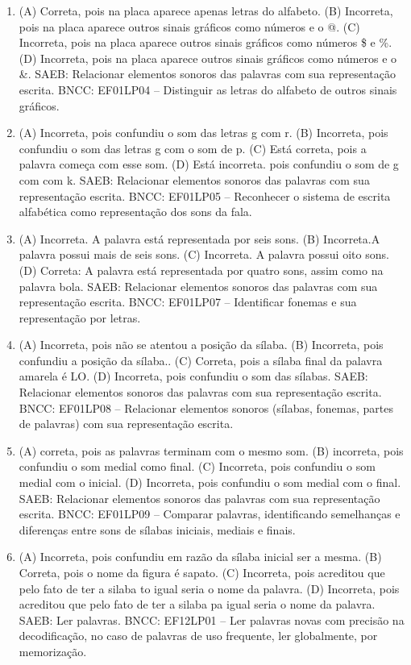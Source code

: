 \begin{enumerate}
\item
(A) Correta, pois na placa aparece apenas letras do alfabeto.
(B) Incorreta, pois na placa aparece outros sinais gráficos como números
e o @.
(C) Incorreta, pois na placa aparece outros sinais gráficos como números
\$ e \%.
(D) Incorreta, pois na placa aparece outros sinais gráficos como números
e o \&.
SAEB: Relacionar elementos sonoros das palavras com sua representação escrita.
BNCC: EF01LP04 -- Distinguir as letras do alfabeto de outros sinais gráficos.

\item
(A) Incorreta, pois confundiu o som das letras g com r.
(B) Incorreta, pois confundiu o som das letras g com o som de p.
(C) Está correta, pois a palavra começa com esse som.
(D) Está incorreta. pois confundiu o som de g com com k.
SAEB: Relacionar elementos sonoros das palavras com sua
representação escrita.
BNCC: EF01LP05 -- Reconhecer o sistema de escrita alfabética como
representação dos sons da fala.

\item
(A) Incorreta. A palavra está representada por seis sons.
(B) Incorreta.A palavra possui mais de seis sons.
(C) Incorreta. A palavra possui oito sons.
(D) Correta: A palavra está representada por quatro sons, assim como na
palavra bola.
SAEB: Relacionar elementos sonoros das palavras com sua
representação escrita.
BNCC: EF01LP07 -- Identificar fonemas e sua representação por
letras.

\item
(A) Incorreta, pois não se atentou a posição da sílaba.
(B) Incorreta, pois confundiu a posição da sílaba..
(C) Correta, pois a sílaba final da palavra amarela é LO.
(D) Incorreta, pois confundiu o som das sílabas.
SAEB: Relacionar
elementos sonoros das palavras com sua representação escrita.
BNCC: EF01LP08 -- Relacionar elementos sonoros (sílabas, fonemas,
partes de palavras) com sua representação escrita.

\item
(A) correta, pois as palavras terminam com o mesmo som.
(B) incorreta, pois confundiu o som medial como final.
(C) Incorreta, pois confundiu o som medial com o inicial.
(D) Incorreta, pois confundiu o som medial com o final.
SAEB: Relacionar elementos sonoros das palavras com sua
representação escrita.
BNCC: EF01LP09 -- Comparar palavras, identificando semelhanças e
diferenças entre sons de sílabas iniciais, mediais e finais.

\item
(A) Incorreta, pois confundiu em razão da sílaba inicial ser a mesma.
(B) Correta, pois o nome da figura é sapato.
(C) Incorreta, pois acreditou que pelo fato de ter a silaba to igual seria o nome da palavra.
(D) Incorreta, pois acreditou que pelo fato de ter a silaba pa igual seria o nome da palavra.
SAEB: Ler palavras.
BNCC: EF12LP01 -- Ler palavras novas com precisão na
decodificação, no caso de palavras de uso frequente, ler globalmente,
por memorização.


\end{enumerate}
